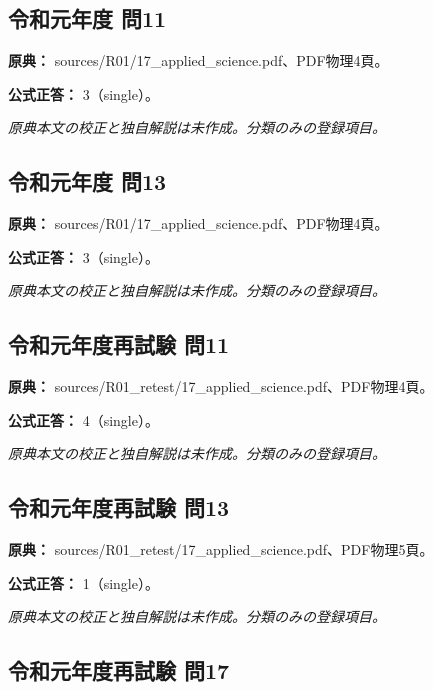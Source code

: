 \subsection{令和元年度 問11}
\label{q:r01-reg-applied-11}

\noindent\textbf{原典：} sources/R01/17\_applied\_science.pdf、PDF物理4頁。

\textbf{公式正答：} 3（single）。

\par\textit{原典本文の校正と独自解説は未作成。分類のみの登録項目。}

\subsection{令和元年度 問13}
\label{q:r01-reg-applied-13}

\noindent\textbf{原典：} sources/R01/17\_applied\_science.pdf、PDF物理4頁。

\textbf{公式正答：} 3（single）。

\par\textit{原典本文の校正と独自解説は未作成。分類のみの登録項目。}

\subsection{令和元年度再試験 問11}
\label{q:r01-ret-applied-11}

\noindent\textbf{原典：} sources/R01\_retest/17\_applied\_science.pdf、PDF物理4頁。

\textbf{公式正答：} 4（single）。

\par\textit{原典本文の校正と独自解説は未作成。分類のみの登録項目。}

\subsection{令和元年度再試験 問13}
\label{q:r01-ret-applied-13}

\noindent\textbf{原典：} sources/R01\_retest/17\_applied\_science.pdf、PDF物理5頁。

\textbf{公式正答：} 1（single）。

\par\textit{原典本文の校正と独自解説は未作成。分類のみの登録項目。}

\subsection{令和元年度再試験 問17}
\label{q:r01-ret-applied-17}

